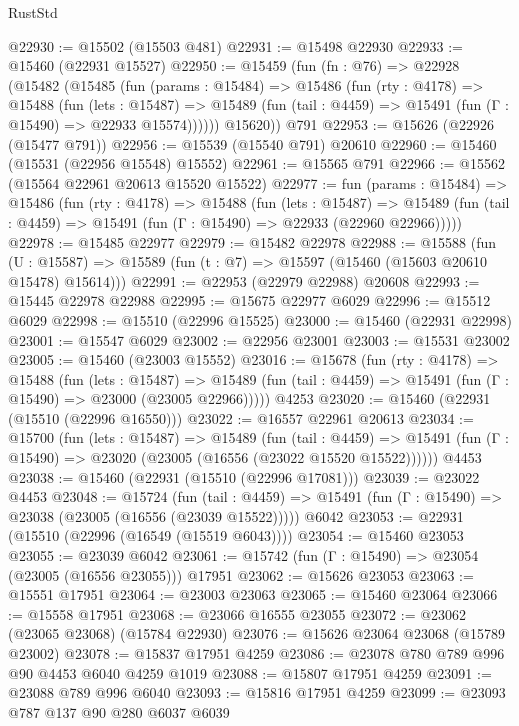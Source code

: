 \begin{lexlean}{RustStd}
\begin{coremodule}
@22930 := @15502 (@15503 @481)
@22931 := @15498 @22930
@22933 := @15460 (@22931 @15527)
@22950 := @15459
    (fun (fn : @76) =>
    @22928
      (@15482
        (@15485
          (fun (params : @15484) =>
          @15486
            (fun (rty : @4178) =>
            @15488
              (fun (lets : @15487) =>
              @15489 (fun (tail : @4459) => @15491 (fun (Γ : @15490) => @22933 @15574))))))
        @15620))
    @791
@22953 := @15626 (@22926 (@15477 @791))
@22956 := @15539 (@15540 @791) @20610
@22960 := @15460 (@15531 (@22956 @15548) @15552)
@22961 := @15565 @791
@22966 := @15562 (@15564 @22961 @20613 @15520 @15522)
@22977 := fun (params : @15484) =>
  @15486
    (fun (rty : @4178) =>
    @15488
      (fun (lets : @15487) =>
      @15489 (fun (tail : @4459) => @15491 (fun (Γ : @15490) => @22933 (@22960 @22966)))))
@22978 := @15485 @22977
@22979 := @15482 @22978
@22988 := @15588
    (fun (U : @15587) => @15589 (fun (t : @7) => @15597 (@15460 (@15603 @20610 @15478) @15614)))
@22991 := @22953 (@22979 @22988) @20608
@22993 := @15445 @22978 @22988
@22995 := @15675 @22977 @6029
@22996 := @15512 @6029
@22998 := @15510 (@22996 @15525)
@23000 := @15460 (@22931 @22998)
@23001 := @15547 @6029
@23002 := @22956 @23001
@23003 := @15531 @23002
@23005 := @15460 (@23003 @15552)
@23016 := @15678
    (fun (rty : @4178) =>
    @15488
      (fun (lets : @15487) =>
      @15489 (fun (tail : @4459) => @15491 (fun (Γ : @15490) => @23000 (@23005 @22966)))))
    @4253
@23020 := @15460 (@22931 (@15510 (@22996 @16550)))
@23022 := @16557 @22961 @20613
@23034 := @15700
    (fun (lets : @15487) =>
    @15489
      (fun (tail : @4459) =>
      @15491 (fun (Γ : @15490) => @23020 (@23005 (@16556 (@23022 @15520 @15522))))))
    @4453
@23038 := @15460 (@22931 (@15510 (@22996 @17081)))
@23039 := @23022 @4453
@23048 := @15724
    (fun (tail : @4459) => @15491 (fun (Γ : @15490) => @23038 (@23005 (@16556 (@23039 @15522)))))
    @6042
@23053 := @22931 (@15510 (@22996 (@16549 (@15519 @6043))))
@23054 := @15460 @23053
@23055 := @23039 @6042
@23061 := @15742 (fun (Γ : @15490) => @23054 (@23005 (@16556 @23055))) @17951
@23062 := @15626 @23053
@23063 := @15551 @17951
@23064 := @23003 @23063
@23065 := @15460 @23064
@23066 := @15558 @17951
@23068 := @23066 @16555 @23055
@23072 := @23062 (@23065 @23068) (@15784 @22930)
@23076 := @15626 @23064 @23068 (@15789 @23002)
@23078 := @15837 @17951 @4259
@23086 := @23078 @780 @789 @996 @90 @4453 @6040 @4259 @1019
@23088 := @15807 @17951 @4259
@23091 := @23088 @789 @996 @6040
@23093 := @15816 @17951 @4259
@23099 := @23093 @787 @137 @90 @280 @6037 @6039

\end{coremodule}
\end{lexlean}
